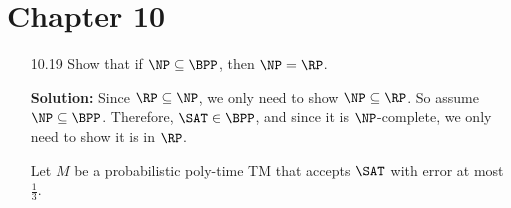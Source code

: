 \chapter*{Chapter 10}

\begin{enumerate}

\item[10.19]Show that if $\NP \subseteq \BPP$, then $\NP = \RP$. 

\par \textbf{Solution:} Since $\RP \subseteq \NP$, we only need to show $\NP \subseteq \RP$. So assume $\NP \subseteq \BPP$. Therefore, $\SAT \in \BPP$, and since it is $\NP$-complete, we only need to show it is in $\RP$.

\par Let $M$ be a probabilistic poly-time TM that accepts $\SAT$ with error at most $\frac{1}{3}$. 

\end{enumerate}